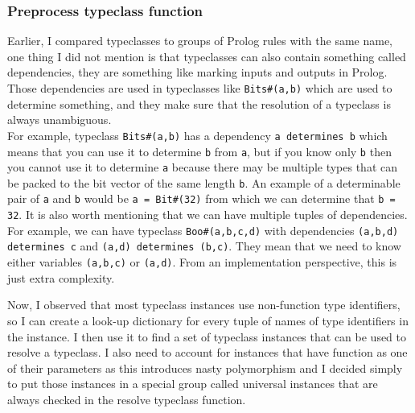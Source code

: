 \documentclass[12pt]{report}
\begin{document}
\subsubsection{Preprocess typeclass function}
Earlier, I compared typeclasses to groups of Prolog rules with the same name, one thing I did not mention is that typeclasses can also contain something called dependencies, they are something like marking inputs and outputs in Prolog. Those dependencies are used in typeclasses like \verb!Bits#(a,b)! which are used to determine something, and they make sure that the resolution of a typeclass is always unambiguous. \\ 
For example, typeclass \verb!Bits#(a,b)! has a dependency \verb!a determines b! which means that you can use it to determine \verb!b! from \verb!a!, but if you know only \verb!b! then you cannot use it to determine \verb!a! because there may be multiple types that can be packed to the bit vector of the same length \verb!b!. An example of a determinable pair of \verb!a! and \verb!b! would be  \verb!a = Bit#(32)! from which we can determine that \verb!b = 32!. It is also worth mentioning that we can have multiple tuples of dependencies. For example, we can have typeclass \verb!Boo#(a,b,c,d)! with dependencies \verb!(a,b,d) determines c! and \verb!(a,d) determines (b,c)!. They mean that we need to know either variables \verb!(a,b,c)! or \verb!(a,d)!. From an implementation perspective, this is just extra complexity.   
\par  
Now, I observed that most typeclass instances use non-function type identifiers, so I can create a look-up dictionary for every tuple of names of type identifiers in the instance. I then use it to find a set of typeclass instances that can be used to resolve a typeclass. I also need to account for instances that have function as one of their parameters as this introduces nasty polymorphism and I decided simply to put those instances in a special group called universal instances that are always checked in the resolve typeclass function.  
\end{document}
